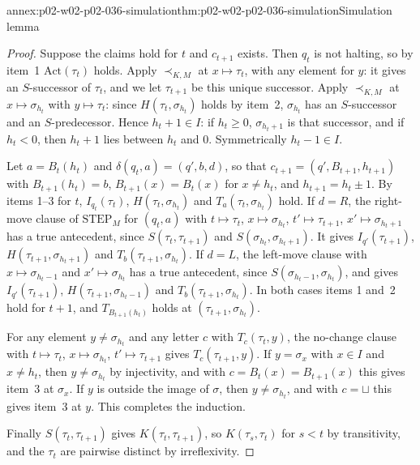 \begin{annexitem}{annex:p02-w02-p02-036-simulation}{thm:p02-w02-p02-036-simulation}{Simulation lemma}
\begin{proof}
Suppose the claims hold for \(t\) and \(c_{t+1}\) exists.  Then \(q_t\) is not
halting, so by item~1 \(\mathrm{Act}(\tau_t)\) holds.  Apply \(\prec_{K,M}\) at
\(x\mapsto\tau_t\), with any element for \(y\): it gives an \(S\)-successor
of \(\tau_t\), and we let \(\tau_{t+1}\) be this unique successor.  Apply
\(\prec_{K,M}\) at \(x\mapsto\sigma_{h_t}\) with \(y\mapsto\tau_t\): since
\(H(\tau_t,\sigma_{h_t})\) holds by item~2, \(\sigma_{h_t}\) has an
\(S\)-successor and an \(S\)-predecessor.  Hence \(h_t+1\in I\): if
\(h_t\geq0\), \(\sigma_{h_t+1}\) is that successor, and if \(h_t<0\), then
\(h_t+1\) lies between \(h_t\) and \(0\).  Symmetrically \(h_t-1\in I\).

Let \(a=B_t(h_t)\) and \(\delta(q_t,a)=(q',b,d)\), so that
\(c_{t+1}=(q',B_{t+1},h_{t+1})\) with \(B_{t+1}(h_t)=b\), \(B_{t+1}(x)=B_t(x)\)
for \(x\neq h_t\), and \(h_{t+1}=h_t\pm1\).  By items 1--3 for \(t\),
\(I_{q_t}(\tau_t)\), \(H(\tau_t,\sigma_{h_t})\) and \(T_a(\tau_t,\sigma_{h_t})\)
hold.  If \(d=R\), the right-move clause of \(\mathrm{STEP}_M\) for \((q_t,a)\)
with \(t\mapsto\tau_t\), \(x\mapsto\sigma_{h_t}\), \(t'\mapsto\tau_{t+1}\),
\(x'\mapsto\sigma_{h_t+1}\) has a true antecedent, since
\(S(\tau_t,\tau_{t+1})\) and \(S(\sigma_{h_t},\sigma_{h_t+1})\).  It gives
\(I_{q'}(\tau_{t+1})\), \(H(\tau_{t+1},\sigma_{h_t+1})\) and
\(T_b(\tau_{t+1},\sigma_{h_t})\).  If \(d=L\), the left-move clause with
\(x\mapsto\sigma_{h_t-1}\) and \(x'\mapsto\sigma_{h_t}\) has a true antecedent,
since \(S(\sigma_{h_t-1},\sigma_{h_t})\), and gives \(I_{q'}(\tau_{t+1})\),
\(H(\tau_{t+1},\sigma_{h_t-1})\) and \(T_b(\tau_{t+1},\sigma_{h_t})\).  In
both cases items 1 and~2 hold for \(t+1\), and \(T_{B_{t+1}(h_t)}\) holds at
\((\tau_{t+1},\sigma_{h_t})\).

For any element \(y\neq\sigma_{h_t}\) and any letter \(c\) with
\(T_c(\tau_t,y)\), the no-change clause with \(t\mapsto\tau_t\),
\(x\mapsto\sigma_{h_t}\), \(t'\mapsto\tau_{t+1}\) gives \(T_c(\tau_{t+1},y)\).
If \(y=\sigma_x\) with \(x\in I\) and \(x\neq h_t\), then \(y\neq\sigma_{h_t}\)
by injectivity, and with \(c=B_t(x)=B_{t+1}(x)\) this gives item~3 at
\(\sigma_x\).  If \(y\) is outside the image of \(\sigma\), then
\(y\neq\sigma_{h_t}\), and with \(c=\sqcup\) this gives item~3 at \(y\).  This
completes the induction.

Finally \(S(\tau_t,\tau_{t+1})\) gives \(K(\tau_t,\tau_{t+1})\), so
\(K(\tau_s,\tau_t)\) for \(s<t\) by transitivity, and the \(\tau_t\) are
pairwise distinct by irreflexivity.
\end{proof}
\end{annexitem}

